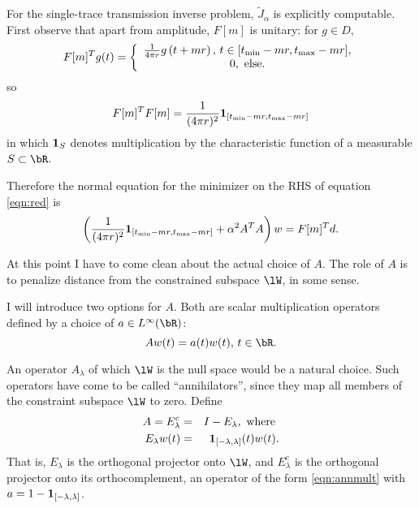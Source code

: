 For the single-trace transmission inverse problem, $\tilde{J}_{\alpha}$ is explicitly
computable. First observe that apart from amplitude, $F[m]$ is
unitary: for $g \in D$,
\begin{equation}
\label{eqn:tran}
F[m]^T g (t) =
\left\{
  \begin{array}{c}
    \frac{1}{4\pi r}g\left(t+mr\right), \, t \in [t_{\rm min}-mr,
    t_{\rm max}-mr],\\
    0, \mbox{ else.}
  \end{array}
\right.
\end{equation}
so
\begin{equation}
  \label{eqn:unit}
  F[m]^TF[m] = \frac{1}{(4\pi r)^2}{\bf 1}_{[t_{\rm min}-mr,  
    t_{\rm max}-mr]}
\end{equation}
in which ${\bf 1}_{S}$ denotes
multiplication by the characteristic function of a measurable 
$S \subset \bR$.

Therefore the normal equation for the minimizer on the RHS of equation \ref{eqn:red} is
\begin{equation}
  \label{eqn:norm1}
  \left(\frac{1}{(4\pi r)^2} {\bf 1}_{[t_{\rm min}-mr,  
      t_{\rm max}-mr]} + \alpha^2 A^TA\right)w= F[m]^Td.
\end{equation}

At this point I have to come clean about the actual choice of
$A$. The role of $A$ is to penalize distance from the constrained
subspace $\lW$, in some sense.

I will introduce two options for $A$. Both are scalar 
multiplication operators defined by a choice of $a \in L^{\infty}(\bR)$:
\begin{equation}
  \label{eqn:annmult}
  A w(t)= a(t)w(t), \, t\in \bR.
\end{equation}

An
operator $A_{\lambda}$ of which $\lW$ is the
null space would be a natural 
choice. Such operators have come to be called ``annihilators'', since
they map all members of the constraint subspace $\lW$ to zero.
Define 
\begin{eqnarray}
  A = E^c_{\lambda}&=&I - E_{\lambda},\mbox{ where } \nonumber \\
  E_{\lambda}w(t) &=&{\bf 1}_{[-\lambda,\lambda]}(t)w(t). 
                      \label{eqn:ann0}
\end{eqnarray}
That is, $E_{\lambda}$ is the orthogonal projector onto $\lW$,
and $E_{\lambda}^c$ is the orthogonal projector onto its
orthocomplement, an operator of the form \ref{eqn:annmult} with $a
= 1 - {\bf 1}_{[-\lambda,\lambda]}$.

